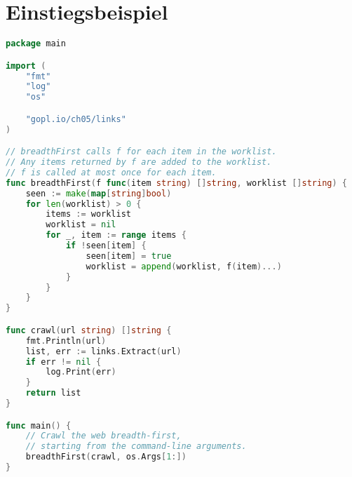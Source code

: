 \section{Einstiegsbeispiel}

\begin{lstlisting}[language=Go,caption={Some Go Code}]
package main

import (
	"fmt"
	"log"
	"os"

	"gopl.io/ch05/links"
)

// breadthFirst calls f for each item in the worklist.
// Any items returned by f are added to the worklist.
// f is called at most once for each item.
func breadthFirst(f func(item string) []string, worklist []string) {
	seen := make(map[string]bool)
	for len(worklist) > 0 {
		items := worklist
		worklist = nil
		for _, item := range items {
			if !seen[item] {
				seen[item] = true
				worklist = append(worklist, f(item)...)
			}
		}
	}
}

func crawl(url string) []string {
	fmt.Println(url)
	list, err := links.Extract(url)
	if err != nil {
		log.Print(err)
	}
	return list
}

func main() {
	// Crawl the web breadth-first,
	// starting from the command-line arguments.
	breadthFirst(crawl, os.Args[1:])
}
\end{lstlisting}
